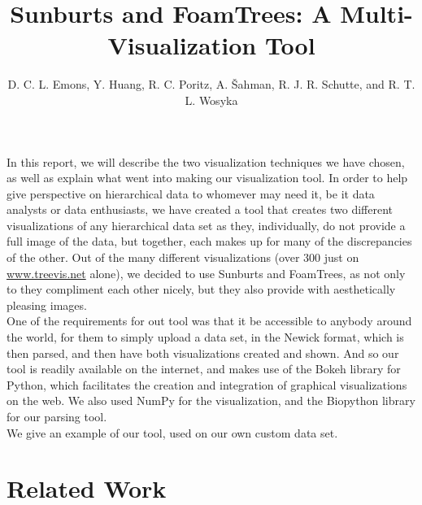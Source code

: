 \documentclass[journal, 9pt]{vgtc}                %
\title{Sunburts and FoamTrees: A Multi-Visualization Tool}
\author{D. C. L. Emons, Y. Huang, R. C. Poritz, A. \v{S}ahman, R. J. R. Schutte, and R. T. L. Wosyka}
\begin{document}


\maketitle

In this report, we will describe the two visualization techniques we have chosen, as well as explain what went into making our visualization tool. In order to help give perspective on hierarchical data
to whomever may need it, be it data analysts or data enthusiasts, we have created a tool that creates two different visualizations of any hierarchical data set as they, individually, do not provide
a full image of the data, but together, each makes up for many of the discrepancies of the other. Out of the many different visualizations (over 300 just on \url{www.treevis.net} alone), we decided
to use Sunburts and FoamTrees, as not only to they compliment each other nicely, but they also provide with aesthetically pleasing images.\\
One of the requirements for out tool was that it be accessible to anybody around the world, for them to simply upload a data set, in the Newick format, which is then parsed, and then have both visualizations created and shown.
And so our tool is readily available on the internet, and makes use of the Bokeh library for Python, which facilitates the creation and integration of graphical visualizations
on the web. We also used NumPy for the visualization, and the Biopython library for our parsing tool.\\
We give an example of our tool, used on our own custom data set.
\section{Related Work}
\end{document}
